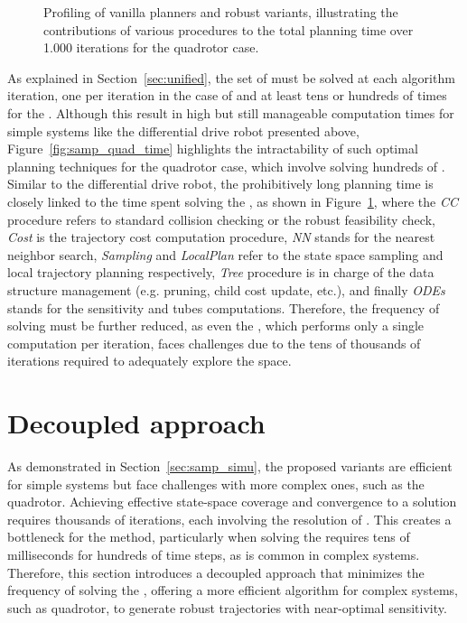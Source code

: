 \begin{figure} [h]
    \centering
     
    \caption{Profiling of vanilla planners and robust variants, illustrating the contributions of various procedures to the total planning time over 1.000 iterations for the quadrotor case.
    }%
    \label{fig:profiling_quad}%
\end{figure}

As explained in Section~\ref{sec:unified}, the set of  must be solved at each algorithm iteration, one per iteration in the case of  and at least tens or hundreds of times for the .
Although this result in high but still manageable computation times for simple systems like the differential drive robot presented above, Figure~\ref{fig:samp_quad_time} highlights the intractability of such optimal planning techniques for the quadrotor case, which involve solving hundreds of .
Similar to the differential drive robot, the prohibitively long planning time is closely linked to the time spent solving the , as shown in Figure~\ref{fig:profiling_quad}, where the \emph{CC} procedure refers to standard collision checking or the robust feasibility check, \emph{Cost} is the trajectory cost computation procedure, \emph{NN} stands for the nearest neighbor search, \emph{Sampling} and \emph{LocalPlan} refer to the state space sampling and local trajectory planning respectively, \emph{Tree} procedure is in charge of the data structure management (e.g. pruning, child cost update, etc.), and finally \emph{ODEs} stands for the sensitivity and tubes computations.
Therefore, the frequency of  solving must be further reduced, as even the , which performs only a single computation per iteration, faces challenges due to the tens of thousands of iterations required to adequately explore the space.

\section{Decoupled approach}\label{sec:decoupled}

As demonstrated in Section~\ref{sec:samp_simu}, the proposed  variants are efficient for simple systems but face challenges with more complex ones, such as the quadrotor. 
Achieving effective state-space coverage and convergence to a solution requires thousands of iterations, each involving the resolution of . 
This creates a bottleneck for the method, particularly when solving the  requires tens of milliseconds for hundreds of time steps, as is common in complex systems.
Therefore, this section introduces a decoupled approach that minimizes the frequency of solving the , offering a more efficient algorithm for complex systems, such as quadrotor, to generate robust trajectories with near-optimal sensitivity.

